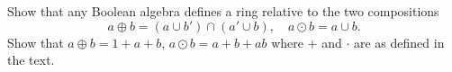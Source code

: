 Show that any Boolean algebra defines a ring relative to the two compositions
$$a \oplus b = (a \cup b') \cap (a' \cup b), \quad a \odot b = a \cup b.$$
Show that $a \oplus b = 1 + a + b$, $a \odot b = a + b + ab$ where $+$ and $\cdot$ are as defined in the text.